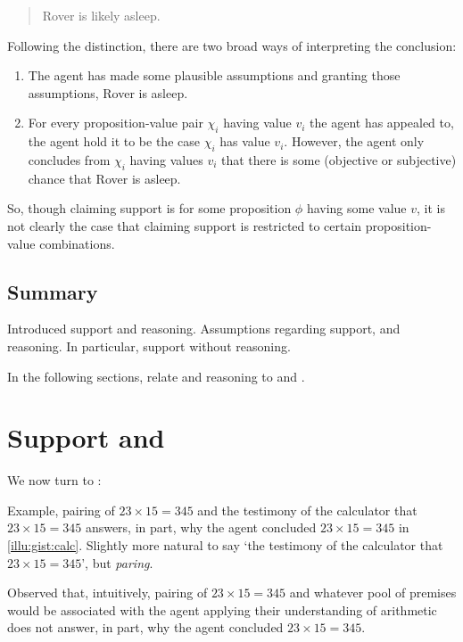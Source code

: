 \begin{note}[Suppositions]
  \begin{quote}
    Rover is likely asleep.
  \end{quote}

  Following the distinction, there are two broad ways of interpreting the conclusion:
  \begin{enumerate}
  \item
    The agent has made some plausible assumptions and granting those assumptions, Rover is asleep.
  \item
    For every proposition-value pair \(\chi_{i}\) having value \(v_{i}\) the agent has appealed to, the agent hold it to be the case \(\chi_{i}\) has value \(v_{i}\).
    However, the agent only concludes from \(\chi_{i}\) having values \(v_{i}\) that there is some (objective or subjective) chance that Rover is asleep.
  \end{enumerate}
  So, though claiming support is for some proposition \(\phi\) having some value \(v\), it is not clearly the case that claiming support is restricted to certain proposition-value combinations.
\end{note}

\subsection{Summary}
\label{sec:summary-1}

\begin{note}
  Introduced support and reasoning.
  Assumptions regarding support, and reasoning.
  In particular, support without reasoning.

  In the following sections, relate \support{} and reasoning to \qWhy{} and \qHow{}.
\end{note}

\section{Support and \qWhy{}}
\label{cha:clarification:sec:support-qWhy}
\label{cha:clar:expand:qWhy}

\begin{note}[Introduction]
  We now turn to \qWhy{}:
  \vspace{-\baselineskip}
  \begin{quote}
    \questionWhyBasic*
  \end{quote}
  Example, pairing of \(23 \times 15 = 345\) and the testimony of the calculator that \(23 \times 15 = 345\) answers, in part, why the agent concluded \(23 \times 15 = 345\) in \autoref{illu:gist:calc}.
  Slightly more natural to say `the testimony of the calculator that \(23 \times 15 = 345\)', but \emph{paring}.

  Observed that, intuitively, pairing of \(23 \times 15 = 345\) and whatever pool of premises would be associated with the agent applying their understanding of arithmetic does not answer, in part, why the agent concluded \(23 \times 15 = 345\).
\end{note}


